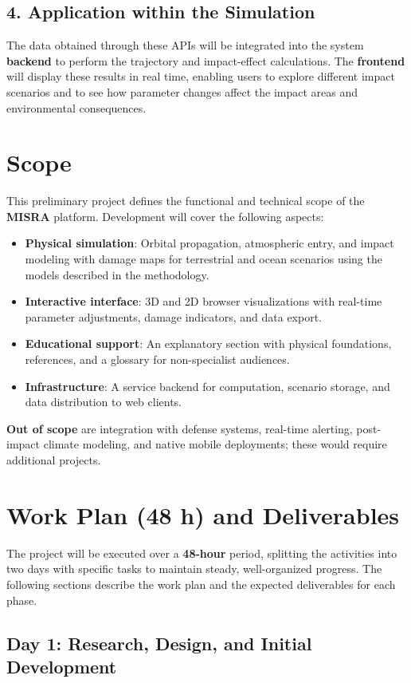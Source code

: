 \documentclass[conference]{IEEEtran}
\begin{document}
\subsection{4. Application within the Simulation}
The data obtained through these APIs will be integrated into the system
\textbf{backend} to perform the trajectory and impact-effect calculations. The
\textbf{frontend} will display these results in real time, enabling users to
explore different impact scenarios and to see how parameter changes affect the
impact areas and environmental consequences.

\section{Scope}
This preliminary project defines the functional and technical scope of the
\textbf{MISRA} platform. Development will cover the following aspects:
\begin{itemize}
	\item \textbf{Physical simulation}: Orbital propagation, atmospheric entry, and
	      impact modeling with damage maps for terrestrial and ocean scenarios
	      using the models described in the methodology.
	\item \textbf{Interactive interface}: 3D and 2D browser visualizations with
	      real-time parameter adjustments, damage indicators, and data export.
	\item \textbf{Educational support}: An explanatory section with physical
	      foundations, references, and a glossary for non-specialist audiences.
	\item \textbf{Infrastructure}: A service backend for computation, scenario
	      storage, and data distribution to web clients.
\end{itemize}
\textbf{Out of scope} are integration with defense systems, real-time alerting,
post-impact climate modeling, and native mobile deployments; these would require
additional projects.

\section{Work Plan (48 h) and Deliverables}
The project will be executed over a \textbf{48-hour} period, splitting the
activities into two days with specific tasks to maintain steady, well-organized
progress. The following sections describe the work plan and the expected
deliverables for each phase.
\subsection{Day 1: Research, Design, and Initial Development}
\end{document}

